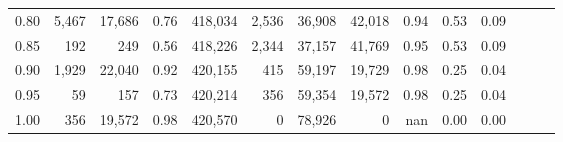 \begin{tabular}{rrrrrrrrrrrrrr}
0.80 &   5,467 &  17,686 &  0.76 &  418,034 &    2,536 &  36,908 &  42,018 &  0.94 &  0.53 &      0.09 \\
0.85 &     192 &     249 &  0.56 &  418,226 &    2,344 &  37,157 &  41,769 &  0.95 &  0.53 &      0.09 \\
0.90 &   1,929 &  22,040 &  0.92 &  420,155 &      415 &  59,197 &  19,729 &  0.98 &  0.25 &      0.04 \\
0.95 &      59 &     157 &  0.73 &  420,214 &      356 &  59,354 &  19,572 &  0.98 &  0.25 &      0.04 \\
1.00 &     356 &  19,572 &  0.98 &  420,570 &        0 &  78,926 &       0 &   nan &  0.00 &      0.00 \\
\bottomrule
\end{tabular}
